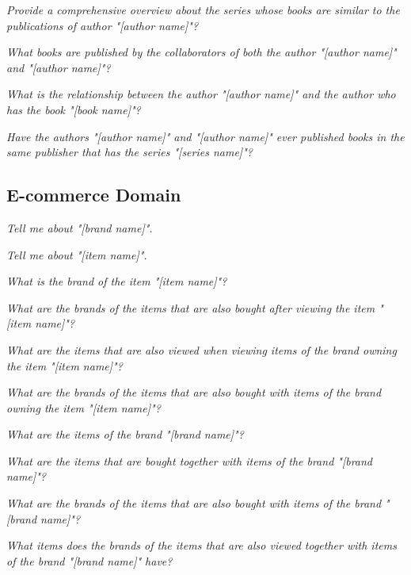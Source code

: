 
\squishlist
\item \textit{Provide a comprehensive overview about the series whose books are similar to the publications of author "[author name]"?}
\item \textit{What books are published by the collaborators of both the author "[author name]" and "[author name]"?}
\item \textit{What is the relationship between the author "[author name]" and the author who has the book "[book name]"?}
\item \textit{Have the authors "[author name]" and "[author name]" ever published books in the same publisher that has the series "[series name]"?}
\squishend

\subsection{E-commerce Domain}


\squishlist
\item \textit{Tell me about "[brand name]".}
\item \textit{Tell me about "[item name]".}
\squishend


\squishlist
\item \textit{What is the brand of the item "[item name]"?}
\item \textit{What are the brands of the items that are also bought after viewing the item "[item name]"?}
\item \textit{What are the items that are also viewed when viewing items of the brand owning the item "[item name]"?}
\item \textit{What are the brands of the items that are also bought with items of the brand owning the item "[item name]"?}
\item \textit{What are the items of the brand "[brand name]"?}
\item \textit{What are the items that are bought together with items of the brand "[brand name]"?}
\item \textit{What are the brands of the items that are also bought with items of the brand "[brand name]"?}
\item \textit{What items does the brands of the items that are also viewed together with items of the brand "[brand name]" have?}
\squishend

